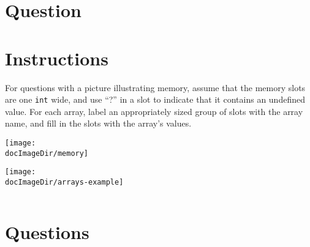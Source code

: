 


\def \memoryImage{%
  \par\medskip\texttt{[image: \\docImageDir/memory]}%
}



\docCopyright

\section{Question}

\section*{Instructions}

For questions with a picture illustrating memory, assume that the memory slots
are one \texttt{int} wide, and use ``?'' in a slot to indicate that it
contains an undefined value.  For each array, label an appropriately sized
group of slots with the array name, and fill in the slots with the array's
values.

\vspace{2.7ex}
\begin{minipage}[t]{0.5\linewidth} \vspace{0ex}
  \vspace{-2.7ex}
  \memoryImage
  \par
  \vspace{-0.63in}
  \hspace{0.45in}
  \texttt{[image: \\docImageDir/arrays-example]}
\end{minipage}
\begin{minipage}[t]{0.5\linewidth} \vspace{0ex}
  \inputminted{cpp}{\docCodeDir/.arrays-example.cpp.gen.section.array}
\end{minipage}

\section*{Questions}

